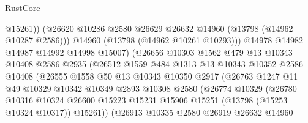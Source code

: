 \begin{lexlean}{RustCore}
\begin{coremodule}
                                @15261))
                            (@26620
                              @10286
                              @2580
                              @26629
                              @26632
                              @14960
                              (@13798 (@14962 @10287 @2586)))
                            @14960
                            (@13798 (@14962 @10261 @10293)))
                          @14978
                          @14982
                          @14987
                          @14992
                          @14998
                          @15007)
                        (@26656
                          @10303
                          @1562
                          @479
                          @13
                          @10343
                          @10408
                          @2586
                          @2935
                          (@26512
                            @1559
                            @484
                            @1313
                            @13
                            @10343
                            @10352
                            @2586
                            @10408
                            (@26555
                              @1558
                              @50
                              @13
                              @10343
                              @10350
                              @2917
                              (@26763
                                @1247
                                @11
                                @49
                                @10329
                                @10342
                                @10349
                                @2893
                                @10308
                                @2580
                                (@26774
                                  @10329
                                  (@26780
                                    @10316
                                    @10324
                                    @26600
                                    @15223
                                    @15231
                                    @15906
                                    @15251
                                    (@13798 (@15253 @10324 @10317))
                                    @15261))
                                (@26913
                                  @10335
                                  @2580
                                  @26919
                                  @26632
                                  @14960

\end{coremodule}
\end{lexlean}
